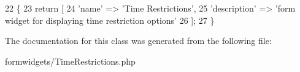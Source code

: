 \begin{DoxyCode}
22     \{
23         \textcolor{keywordflow}{return} [
24             \textcolor{stringliteral}{'name'}        => \textcolor{stringliteral}{'Time Restrictions'},
25             \textcolor{stringliteral}{'description'} => \textcolor{stringliteral}{'form widget for displaying time restriction options'}
26         ];
27     \}
\end{DoxyCode}


The documentation for this class was generated from the following file\+:\begin{DoxyCompactItemize}
\item 
formwidgets/Time\+Restrictions.\+php\end{DoxyCompactItemize}
